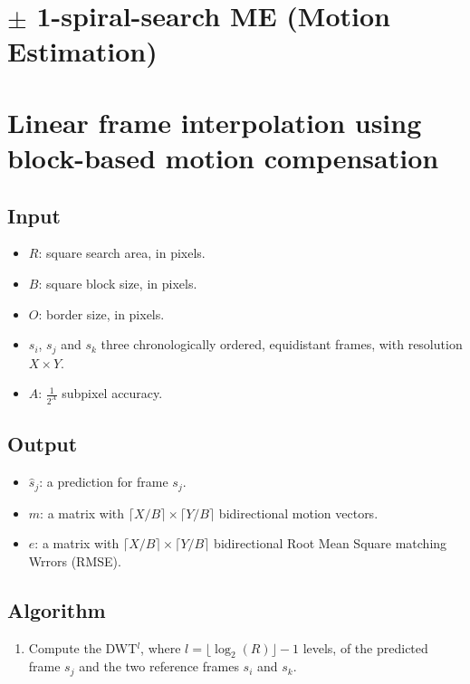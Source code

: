 {

\section{$\pm$ 1-spiral-search ME (Motion Estimation)}

\section{Linear frame interpolation using block-based motion compensation}

\subsection{Input}
\begin{itemize}
\tightlist
\item
  \(R\): square search area, in pixels.
\item
  \(B\): square block size, in pixels.
\item
  \(O\): border size, in pixels.
\item
  \(s_i\), \(s_j\) and \(s_k\) three chronologically ordered,
  equidistant frames, with resolution \(X\times Y\).
\item
  \(A\): \(\frac{1}{2^A}\) subpixel accuracy.
\end{itemize}

\subsection{Output}
\begin{itemize}
\tightlist
\item
  \(\hat{s}_j\): a prediction for frame \(s_j\).
\item
  \(m\): a matrix with \(\lceil X/B\rceil \times \lceil Y/B\rceil\)
  bidirectional motion vectors.
\item
  \(e\): a matrix with \(\lceil X/B\rceil \times \lceil Y/B\rceil\)
  bidirectional Root Mean Square matching Wrrors (RMSE).
\end{itemize}

\subsection{Algorithm}
\begin{enumerate}
\tightlist

\item
  Compute the DWT\(^l\), where \(l=\lfloor\log_2(R)\rfloor-1\) levels,
  of the predicted frame \(s_j\) and the two reference frames \(s_i\)
  and \(s_k\).


\end{enumerate}}
